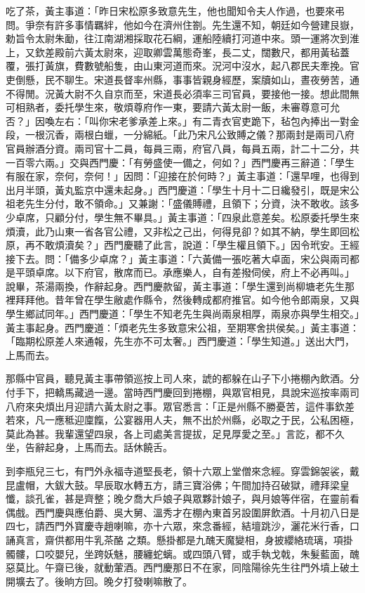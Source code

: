 \begin{showcontents}{}
吃了茶，黃主事道：「昨日宋松原多致意先生，他也聞知令夫人作過，也要來弔問。爭奈有許多事情羈絆，他如今在濟州住劄。先生還不知，朝廷如今營建艮嶽，勅旨令太尉朱勔，往江南湖湘採取花石綱，運船陸續打河道中來。頭一運將次到淮上，又欽差殿前六黃太尉來，迎取卿雲萬態奇峯，長二丈，闊數尺，都用黃毡蓋覆，張打黃旗，費數號船隻，由山東河道而來。況河中沒水，起八郡民夫牽挽。官吏倒懸，民不聊生。宋道長督率州縣，事事皆親身經歷，案牘如山，晝夜勞苦，通不得閒。況黃大尉不久自京而至，宋道長必須率三司官員，要接他一接。想此間無可相熟者，委托學生來，敬煩尊府作一東，要請六黃太尉一飯，未審尊意可允否？」因喚左右：「叫你宋老爹承差上來。」有二青衣官吏跪下，毡包內捧出一對金段，一根沉香，兩根白蠟，一分綿紙。「此乃宋凡公致賻之儀？那兩封是兩司八府官員辦酒分資。兩司官十二員，每員三兩，府官八員，每員五兩，計二十二分，共一百零六兩。」交與西門慶：「有勞盛使一備之，何如？」西門慶再三辭道：「學生有服在家，奈何，奈何！」因問：「迎接在於何時？」黃主事道：「還早哩，也得到出月半頭，黃丸監京中還未起身。」西門慶道：「學生十月十二日纔發引，既是宋公祖老先生分付，敢不領命。」又兼謝：「盛儀賻禮，且領下；分資，決不敢收。該多少卓席，只顧分付，學生無不畢具。」黃主事道：「四泉此意差矣。松原委托學生來煩瀆，此乃山東一省各官公禮，又非松之己出，何得見卻？如其不納，學生即回松原，再不敢煩瀆矣？」西門慶聽了此言，說道：「學生權且領下。」因令玳安。王經接下去。問：「備多少卓席？」黃主事道：「六黃備一張吃著大卓面，宋公與兩司都是平頭卓席。以下府官，散席而已。承應樂人，自有差撥伺侯，府上不必再叫。」說畢，茶湯兩換，作辭起身。西門慶款留，黃主事道：「學生還到尚柳塘老先生那裡拜拜他。昔年曾在學生敝處作縣令，然後轉成都府推官。如今他令郎兩泉，又與學生鄉試同年。」西門慶道：「學生不知老先生與尚兩泉相厚，兩泉亦與學生相交。」黃主事起身。西門慶道：「煩老先生多致意宋公祖，至期寒舍拱侯矣。」黃主事道：「臨期松原差人來通報，先生亦不可太奢。」西門慶道：「學生知道。」送出大門，上馬而去。

那縣中官員，聽見黃主事帶領巡按上司人來，諕的都躲在山子下小捲棚內飲酒。分付手下，把轎馬藏過一邊。當時西門慶回到捲棚，與眾官相見，具說宋巡按率兩司八府來央煩出月迎請六黃太尉之事。眾官悉言：「正是州縣不勝憂苦，這件事欽差若來，凡一應秪迎廩餼，公宴器用人夫，無不出於州縣，必取之于民，公私困極，莫此為甚。我輩還望四泉，各上司處美言提拔，足見厚愛之至。」言訖，都不久坐，告辭起身，上馬而去。話休饒舌。

到李瓶兒三七，有門外永福寺道堅長老，領十六眾上堂僧來念經。穿雲錦袈裟，戴昆盧帽，大鈸大鼓。早辰取水轉五方，請三寶浴佛；午間加持召破獄，禮拜梁皇懺，談孔雀，甚是齊整；晚夕喬大戶娘子與眾夥計娘子，與月娘等伴宿，在靈前看偶戲。西門慶與應伯爵、吳大舅、溫秀才在棚內東首另設圍屏飲酒。十月初八日是四七，請西門外寶慶寺趙喇嘛，亦十六眾，來念番經，結壇跳沙，灑花米行香，口誦真言，齋供都用牛乳茶酪 之類。懸掛都是九醜天魔變相，身披纓絡琉璃，項掛髑髏，口咬嬰兒，坐跨妖魅，腰纏蛇螭。或四頭八臂，或手執戈戟，朱髮藍面，醜惡莫比。午齋已後，就動葷酒。西門慶那日不在家，同陰陽徐先生往門外墳上破土開壙去了。後晌方回。晚夕打發喇嘛散了。


\end{showcontents}
